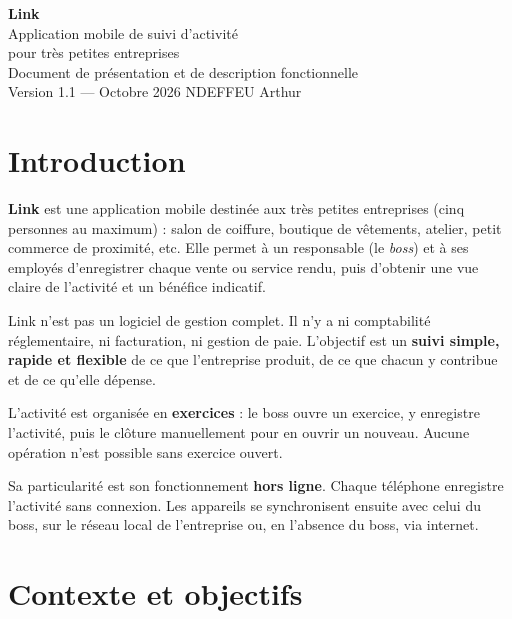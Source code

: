 \documentclass[11pt,a4paper]{article}
\begin{document}
	
	\begin{titlepage}
		\centering
		\vspace*{3cm}
		{\fontsize{48}{56}\selectfont\bfseries\color{linkblue} Link}\\[0.8cm]
		{\Large Application mobile de suivi d'activité\\pour très petites entreprises}\\[5cm]
		{\large Document de présentation et de description fonctionnelle}\\[0.5cm]
		{\color{linkgrey} Version 1.1 --- Octobre 2026}
		\vfill
		{\color{linkgrey}\small NDEFFEU Arthur}
	\end{titlepage}
	
	\tableofcontents
	\newpage
	
	\section{Introduction}
	\textbf{Link} est une application mobile destinée aux très petites entreprises (cinq personnes au maximum) : salon de coiffure, boutique de vêtements, atelier, petit commerce de proximité, etc. Elle permet à un responsable (le \emph{boss}) et à ses employés d'enregistrer chaque vente ou service rendu, puis d'obtenir une vue claire de l'activité et un bénéfice indicatif.
	
	Link n'est pas un logiciel de gestion complet. Il n'y a ni comptabilité réglementaire, ni facturation, ni gestion de paie. L'objectif est un \textbf{suivi simple, rapide et flexible} de ce que l'entreprise produit, de ce que chacun y contribue et de ce qu'elle dépense.
	
	L'activité est organisée en \textbf{exercices} : le boss ouvre un exercice, y enregistre l'activité, puis le clôture manuellement pour en ouvrir un nouveau. Aucune opération n'est possible sans exercice ouvert.
	
	Sa particularité est son fonctionnement \textbf{hors ligne}. Chaque téléphone enregistre l'activité sans connexion. Les appareils se synchronisent ensuite avec celui du boss, sur le réseau local de l'entreprise ou, en l'absence du boss, via internet.
	
	\section{Contexte et objectifs}
\end{document}
